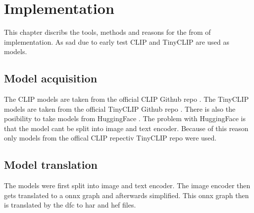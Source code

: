 \chapter{Implementation
    \label{chapter:implementation}}

This chapter discribs the tools, methods and reasons for the from of implementation.
As sad due to early test CLIP and TinyCLIP are used as models.

\section{Model acquisition}

The CLIP models are taken from the official CLIP Github repo \cite{clipgit}.
The TinyCLIP models are taken from the official TinyCLIP Github repo \cite{tinyclipgit}.
There is also the posibility to take models from HuggingFace \cite{huggingface}.
The problem with HuggingFace is that the model cant be split into image and text encoder.
Because of this reason only models from the offical CLIP repectiv TinyCLIP repo were used.

\section{Model translation}
The models were first split into image and text encoder.
The image encoder then gets translated to a onnx graph and afterwards simplified.
This onnx graph then is translated by the \acrshort{dfc} to \acrshort{har} and \acrshort{hef} files.

